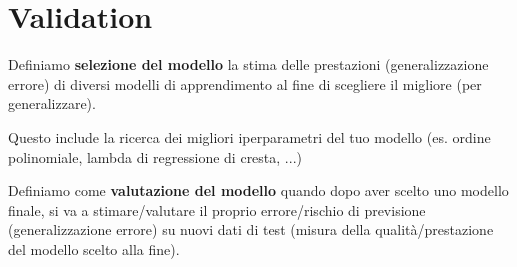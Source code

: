 \newpage
\section{Validation}
\begin{definition}
    Definiamo \textbf{selezione del modello} la stima delle prestazioni (generalizzazione errore) di diversi modelli 
    di apprendimento al fine di scegliere il migliore (per generalizzare).
\end{definition}
\hspace{-15pt}Questo include la ricerca dei migliori iperparametri del tuo modello (es. ordine polinomiale, lambda di regressione di cresta, ...)
\begin{definition}
    Definiamo come \textbf{valutazione del modello} quando dopo aver scelto uno modello finale, si va a stimare/valutare il proprio
    errore/rischio di previsione (generalizzazione errore) su nuovi dati di test (misura della qualità/prestazione del modello scelto alla fine).
\end{definition}
